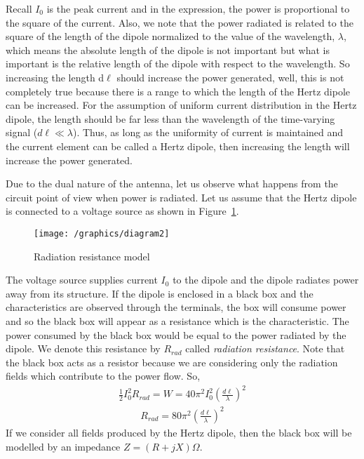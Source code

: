 Recall $I_0$ is the peak current and in the expression, the power is proportional to the square of the current. Also, we note that the power radiated is related to the square of the length of the dipole normalized to the value of the wavelength, $\lambda$, which means the absolute length of the dipole is not important but what is important is the relative length of the dipole with respect to the wavelength. So increasing the length d$\ell$ should increase the power generated, well, this is not completely true because there is a range to which the length of the Hertz dipole can be increased. For the assumption of uniform current distribution in the Hertz dipole, the length should be far less than the wavelength of the time-varying signal ($d\ell \ll \lambda$). Thus, as long as the uniformity of current is maintained and the current element can be called a Hertz dipole, then increasing the length will increase the power generated. 

Due to the dual nature of the antenna, let us observe what happens from the circuit point of view when power is radiated. Let us assume that the Hertz dipole is connected to a voltage source as shown in Figure~\ref{fig:radresistantmodel}.
\begin{figure}[h]
\centering
\texttt{[image: /graphics/diagram2]}
\caption{Radiation resistance model}
\label{fig:radresistantmodel}
\end{figure}

The voltage source supplies current $I_0$ to the dipole and the dipole radiates power away from its structure. If the dipole is enclosed in a black box and the characteristics are observed through the terminals, the box will consume power and so the black box will appear as a resistance which is the characteristic. The power consumed by the black box would be equal to the power radiated by the dipole. We denote this resistance by $R_{rad}$ called \emph{radiation resistance}. Note that the black box acts as a resistor because we are considering only the radiation fields which contribute to the power flow. So,
\begin{align*}
\frac{1}{2}I_0^2R_{rad} = W = 40\pi^2I_0^2\left(\frac{d\ell}{\lambda}\right)^2
\end{align*}
\begin{align}
R_{rad} = 80\pi^2\left(\frac{d\ell}{\lambda}\right)^2
\label{eqn:radresistance}
\end{align}
If we consider all fields produced by the Hertz dipole, then the black box will be modelled by an impedance $Z = (R + jX)\Omega$. 


